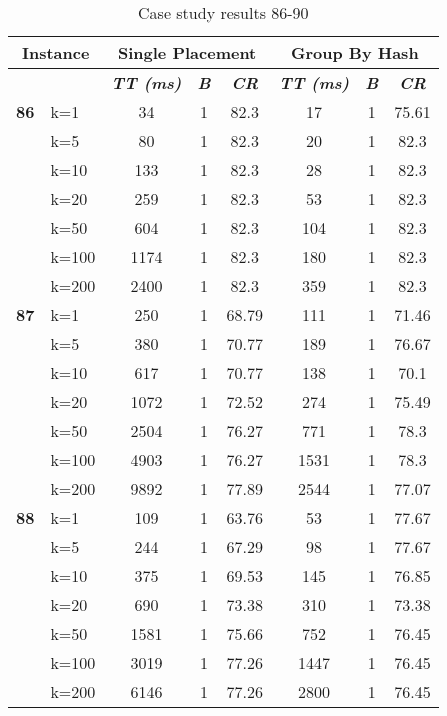     \begin{table}[htbp]
    \caption{Case study results 86-90}
    \centering
    \begin{tabular}{|l|l|c|c|c|c|c|c|}
    \hline
    \multicolumn{ 2}{|c|}{\textbf{Instance}} & \multicolumn{ 3}{c|}{\textbf{Single Placement}} & \multicolumn{ 3}{c|}{\textbf{Group By Hash}} \\ \hline
    \multicolumn{ 2}{|l|}{} & \textbf{\textit{TT (ms)}} & \textbf{\textit{B}} & \textbf{\textit{CR}} & \textbf{\textit{TT (ms)}} & \textbf{\textit{B}} & \textbf{\textit{CR}} \\ \hline
    \multicolumn{1}{|r|}{\textbf{86}} & k=1 & 34 & 1 & 82.3 & 17 & 1 & 75.61 \\ 
     & k=5 & 80 & 1 & 82.3 & 20 & 1 & 82.3 \\ 
     & k=10 & 133 & 1 & 82.3 & 28 & 1 & 82.3 \\ 
     & k=20 & 259 & 1 & 82.3 & 53 & 1 & 82.3 \\ 
     & k=50 & 604 & 1 & 82.3 & 104 & 1 & 82.3 \\ 
     & k=100 & 1174 & 1 & 82.3 & 180 & 1 & 82.3 \\ 
     & k=200 & 2400 & 1 & 82.3 & 359 & 1 & 82.3 \\ \hline
    \multicolumn{1}{|r|}{\textbf{87}} & k=1 & 250 & 1 & 68.79 & 111 & 1 & 71.46 \\ 
     & k=5 & 380 & 1 & 70.77 & 189 & 1 & 76.67 \\ 
     & k=10 & 617 & 1 & 70.77 & 138 & 1 & 70.1 \\ 
     & k=20 & 1072 & 1 & 72.52 & 274 & 1 & 75.49 \\ 
     & k=50 & 2504 & 1 & 76.27 & 771 & 1 & 78.3 \\ 
     & k=100 & 4903 & 1 & 76.27 & 1531 & 1 & 78.3 \\ 
     & k=200 & 9892 & 1 & 77.89 & 2544 & 1 & 77.07 \\ \hline
    \multicolumn{1}{|r|}{\textbf{88}} & k=1 & 109 & 1 & 63.76 & 53 & 1 & 77.67 \\ 
     & k=5 & 244 & 1 & 67.29 & 98 & 1 & 77.67 \\ 
     & k=10 & 375 & 1 & 69.53 & 145 & 1 & 76.85 \\ 
     & k=20 & 690 & 1 & 73.38 & 310 & 1 & 73.38 \\ 
     & k=50 & 1581 & 1 & 75.66 & 752 & 1 & 76.45 \\ 
     & k=100 & 3019 & 1 & 77.26 & 1447 & 1 & 76.45 \\ 
     & k=200 & 6146 & 1 & 77.26 & 2800 & 1 & 76.45 \\ \hline

\end{tabular}
\end{table}
